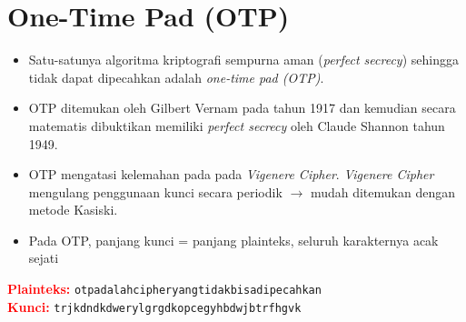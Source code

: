 \documentclass{article}
\begin{document}

\section*{One-Time Pad (OTP)}

\begin{itemize}
    \item Satu-satunya algoritma kriptografi sempurna aman (\textit{perfect secrecy}) sehingga tidak dapat dipecahkan adalah \textit{one-time pad (OTP)}.
    \item OTP ditemukan oleh Gilbert Vernam pada tahun 1917 dan kemudian secara matematis dibuktikan memiliki \textit{perfect secrecy} oleh Claude Shannon tahun 1949.
    \item OTP mengatasi kelemahan pada pada \textit{Vigenere Cipher}. \textit{Vigenere Cipher} mengulang penggunaan kunci secara periodik $\rightarrow$ mudah ditemukan dengan metode Kasiski.
    \item Pada OTP, panjang kunci = panjang plainteks, seluruh karakternya acak sejati
\end{itemize}

\vspace{5mm}

\begin{flushleft}
\textcolor{red}{\textbf{Plainteks:}} \texttt{otpadalahcipheryangtidakbisadipecahkan} \\
\textcolor{red}{\textbf{Kunci:}} \texttt{trjkdndkdwerylgrgdkopcegyhbdwjbtrfhgvk}
\end{flushleft}
\end{document}
